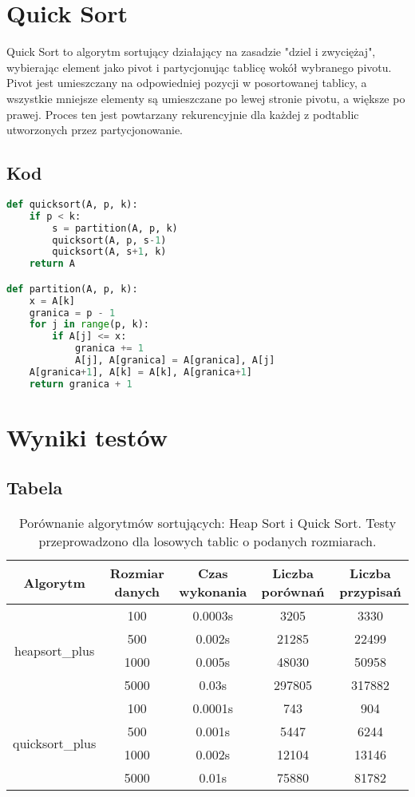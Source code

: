 \documentclass{article}
\begin{document}
\section{Quick Sort}
Quick Sort to algorytm sortujący działający na zasadzie "dziel i zwyciężaj", wybierając element jako pivot i partycjonując tablicę wokół wybranego pivotu. Pivot jest umieszczany na odpowiedniej pozycji w posortowanej tablicy, a wszystkie mniejsze elementy są umieszczane po lewej stronie pivotu, a większe po prawej. Proces ten jest powtarzany rekurencyjnie dla każdej z podtablic utworzonych przez partycjonowanie.

\subsection{Kod}
\begin{lstlisting}[language=Python]
    def quicksort(A, p, k):
    if p < k:
        s = partition(A, p, k)
        quicksort(A, p, s-1)
        quicksort(A, s+1, k)
    return A

def partition(A, p, k):
    x = A[k]
    granica = p - 1
    for j in range(p, k):
        if A[j] <= x:
            granica += 1
            A[j], A[granica] = A[granica], A[j]
    A[granica+1], A[k] = A[k], A[granica+1]
    return granica + 1
\end{lstlisting}

\section{Wyniki testów}
\subsection{Tabela}
\begin{table}[H]
    \centering
    \begin{tabular}{|c|c|c|c|c|}
    \hline
    Algorytm & Rozmiar danych & Czas wykonania & Liczba porównań & Liczba przypisań \\
    \hline
    \multirow{4}{*}{heapsort\_plus} & 100 & 0.0003s & 3205 & 3330 \\
    \cline{2-5}
    & 500 & 0.002s & 21285 & 22499 \\
    \cline{2-5}
    & 1000 & 0.005s & 48030 & 50958 \\
    \cline{2-5}
    & 5000 & 0.03s & 297805 & 317882 \\
    \hline
    \multirow{4}{*}{quicksort\_plus} & 100 & 0.0001s & 743 & 904 \\
    \cline{2-5}
    & 500 & 0.001s & 5447 & 6244 \\
    \cline{2-5}
    & 1000 & 0.002s & 12104 & 13146 \\
    \cline{2-5}
    & 5000 & 0.01s & 75880 & 81782 \\
    \hline
    \end{tabular}
    \caption{ Porównanie algorytmów sortujących: Heap Sort i Quick Sort. Testy przeprowadzono dla losowych tablic o podanych rozmiarach.}
\end{table}
\end{document}
